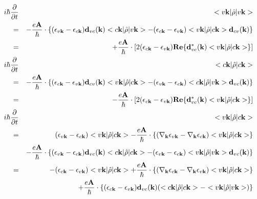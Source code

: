 \documentclass[aps,prb,preprint]{revtex4-1}
\begin{document}
\begin{appendix}
\begin{eqnarray}
i \hbar \frac{ \partial }{\partial t } &&<v{\bf k}| \hat{\rho} |v{\bf k}> \nonumber \\
=&& -\frac{e{\bf A}}{\hbar} \cdot  \{ (\epsilon_{v{\bf k}}-\epsilon_{c{\bf k}}) {\bf d}_{vc}({\bf k}) <c{\bf k}| \hat{\rho} |v{\bf k}>  -  (\epsilon_{c{\bf k}}-\epsilon_{v{\bf k}})<v{\bf k}| \hat{\rho} |c{\bf k}> {\bf d}_{cv}({\bf k}) \nonumber \} \\
=&& +\frac{e{\bf A}}{\hbar} \cdot [2 (\epsilon_{c{\bf k}}-\epsilon_{v{\bf k}}) {\bf Re}\{ {\bf d}_{vc}^*({\bf k}) <v{\bf k}| \hat{\rho} |c{\bf k}> \} ] \\
%
i \hbar \frac{ \partial }{\partial t } &&<c{\bf k}| \hat{\rho} |c{\bf k}> \nonumber \\
=&& -\frac{e{\bf A}}{\hbar} \cdot \{ (\epsilon_{c{\bf k}}-\epsilon_{v{\bf k}}) {\bf d}_{cv}({\bf k}) <v{\bf k}| \hat{\rho} |c{\bf k}>  -  (\epsilon_{v{\bf k}}-\epsilon_{c{\bf k}})<c{\bf k}| \hat{\rho} |v{\bf k}> {\bf d}_{vc}({\bf k}) \} \nonumber \\
=&& -\frac{e{\bf A}}{\hbar} \cdot [ 2 (\epsilon_{c{\bf k}}-\epsilon_{v{\bf k}}) {\bf Re}\{ {\bf d}_{vc}^*({\bf k}) <v{\bf k}| \hat{\rho} |c{\bf k}> \} ] \\
%
i \hbar \frac{ \partial }{\partial t } &&<v{\bf k}| \hat{\rho} |c{\bf k}> \nonumber \\
= && (\epsilon_{v{\bf k}}-\epsilon_{c{\bf k}}) <v{\bf k}| \hat{\rho} |c{\bf k}>  -\frac{e{\bf A}}{\hbar} \cdot \{ (\nabla_{\bf k} \epsilon_{v{\bf k}} - \nabla_{\bf k} \epsilon_{c{\bf k}}) <v{\bf k}| \hat{\rho} |c{\bf k}> \} \nonumber  \\
&& -\frac{e{\bf A}}{\hbar} \cdot  \{ (\epsilon_{v{\bf k}}-\epsilon_{c{\bf k}}) {\bf d}_{vc}({\bf k}) <c{\bf k}| \hat{\rho} |c{\bf k}>  -  (\epsilon_{v{\bf k}}-\epsilon_{c{\bf k}})<v{\bf k}| \hat{\rho} |v{\bf k}> {\bf d}_{vc}({\bf k}) \} \nonumber \\
= && - (\epsilon_{c{\bf k}}-\epsilon_{v{\bf k}}) <v{\bf k}| \hat{\rho} |c{\bf k}>  + \frac{e{\bf A}}{\hbar} \cdot \{ (\nabla_{\bf k} \epsilon_{c{\bf k}} - \nabla_{\bf k} \epsilon_{v{\bf k}}) <v{\bf k}| \hat{\rho} |c{\bf k}> \} \nonumber  \\
&& + \frac{e{\bf A}}{\hbar} \cdot  \{ (\epsilon_{c{\bf k}}-\epsilon_{v{\bf k}}) {\bf d}_{vc}({\bf k}) ( <c{\bf k}| \hat{\rho} |c{\bf k}> - <v{\bf k}| \hat{\rho} |v{\bf k}> ) \}
\end{eqnarray}


\end{appendix}
\end{document}
